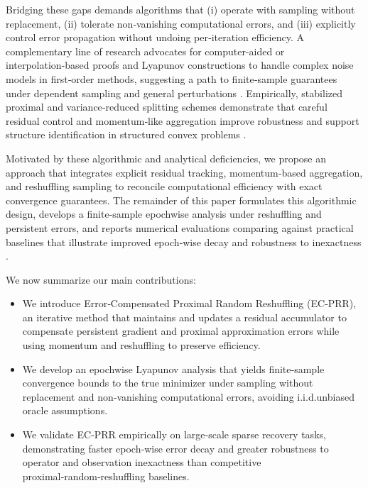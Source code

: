 \documentclass{article}
\begin{document}
Bridging these gaps demands algorithms that (i) operate with sampling without replacement, (ii) tolerate non‑vanishing computational errors, and (iii) explicitly control error propagation without undoing per‑iteration efficiency. A complementary line of research advocates for computer‑aided or interpolation‑based proofs and Lyapunov constructions to handle complex noise models in first‑order methods, suggesting a path to finite‑sample guarantees under dependent sampling and general perturbations \citep{Juditsky2008SolvingVI,Rubbens2025ComputeraidedAO}. Empirically, stabilized proximal and variance‑reduced splitting schemes demonstrate that careful residual control and momentum‑like aggregation improve robustness and support structure identification in structured convex problems \citep{Chouzenoux2022SABRINAAS,Dai2023AVA}.

Motivated by these algorithmic and analytical deficiencies, we propose an approach that integrates explicit residual tracking, momentum‑based aggregation, and reshuffling sampling to reconcile computational efficiency with exact convergence guarantees. The remainder of this paper formulates this algorithmic design, develops a finite‑sample epochwise analysis under reshuffling and persistent errors, and reports numerical evaluations comparing against practical baselines that illustrate improved epoch‑wise decay and robustness to inexactness \citep{Kim2021OnlineSG}.

We now summarize our main contributions:
\begin{itemize}
  \item We introduce Error‑Compensated Proximal Random Reshuffling (EC‑PRR), an iterative method that maintains and updates a residual accumulator to compensate persistent gradient and proximal approximation errors while using momentum and reshuffling to preserve efficiency.
  \item We develop an epochwise Lyapunov analysis that yields finite‑sample convergence bounds to the true minimizer under sampling without replacement and non‑vanishing computational errors, avoiding i.i.d.\/unbiased oracle assumptions.
  \item We validate EC‑PRR empirically on large‑scale sparse recovery tasks, demonstrating faster epoch‑wise error decay and greater robustness to operator and observation inexactness than competitive proximal‑random‑reshuffling baselines.
\end{itemize}



\end{document}

